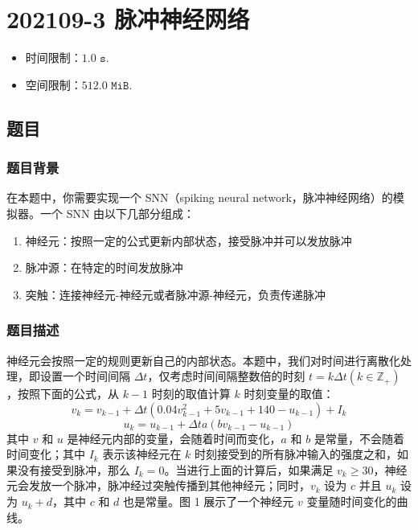 \section{202109-3 脉冲神经网络}
	\begin{itemize}
		\item 时间限制：$1.0\texttt{ s}$.
		\item 空间限制：$512.0\texttt{ MiB}$.
	\end{itemize}
	\subsection{题目}
		\subsubsection{题目背景}
			在本题中，你需要实现一个 SNN（spiking neural network，脉冲神经网络）的模拟器。一个 SNN 由以下几部分组成：
			\begin{enumerate}
				\item 神经元：按照一定的公式更新内部状态，接受脉冲并可以发放脉冲
				\item 脉冲源：在特定的时间发放脉冲
				\item 突触：连接神经元-神经元或者脉冲源-神经元，负责传递脉冲
			\end{enumerate}
		\subsubsection{题目描述}
			\par 神经元会按照一定的规则更新自己的内部状态。本题中，我们对时间进行离散化处理，即设置一个时间间隔 $\Delta t$，仅考虑时间间隔整数倍的时刻 $t=k\Delta t(k\in\mathbb{Z}_+)$，按照下面的公式，从 $k-1$ 时刻的取值计算 $k$ 时刻变量的取值：
			$$v_k=v_{k-1}+\Delta t(0.04v_{k-1}^2+5v_{k-1}+140-u_{k-1})+I_k$$
			$$u_k=u_{k-1}+\Delta ta(bv_{k-1}-u_{k-1})$$
			其中 $v$ 和 $u$ 是神经元内部的变量，会随着时间而变化，$a$ 和 $b$ 是常量，不会随着时间变化；其中 $I_k$ 表示该神经元在 $k$ 时刻接受到的所有脉冲输入的强度之和，如果没有接受到脉冲，那么 $I_k=0$。当进行上面的计算后，如果满足 $v_k\geq 30$，神经元会发放一个脉冲，脉冲经过突触传播到其他神经元；同时，$v_k$ 设为 $c$ 并且 $u_k$ 设为 $u_k+d$，其中 $c$ 和 $d$ 也是常量。图 1 展示了一个神经元 $v$ 变量随时间变化的曲线。
			
